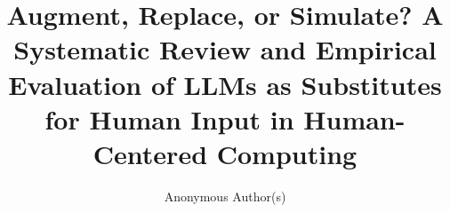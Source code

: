 \documentclass[manuscript,review,anonymous,nonacm,screen]{acmart}
\begin{document}
\title{Augment, Replace, or Simulate? A Systematic Review and Empirical Evaluation of LLMs as Substitutes for Human Input in Human-Centered Computing}
\author{Anonymous Author(s)}
\renewcommand{\shortauthors}{Anonymous Author(s)}
\begin{abstract}\end{abstract}
\maketitle




\end{document}
